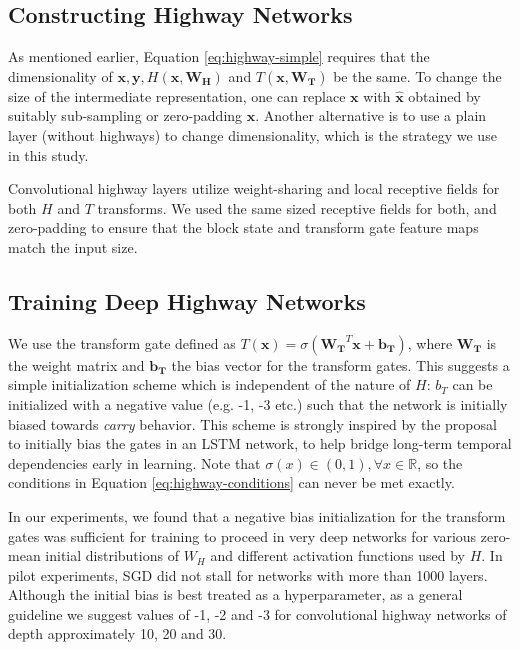 \documentclass{article}
\renewcommand{\vec}[1]{\mathbf{#1}}
\begin{document}
\subsection{Constructing Highway Networks}

As mentioned earlier, Equation \ref{eq:highway-simple} requires that the dimensionality of $\vec{x}, \vec{y}, H(\vec{x}, \vec{W_H})$ and $T(\vec{x}, \vec{W_T})$ be the same. To change the size of the intermediate representation, one can replace $\vec{x}$ with $\vec{\hat{x}}$ obtained by suitably sub-sampling or zero-padding $\vec{x}$. Another alternative is to use a plain layer (without highways) to change dimensionality, which is the strategy we use in this study.

Convolutional highway layers utilize weight-sharing and local receptive fields for both $H$ and $T$ transforms. We used the same sized receptive fields for both, and zero-padding to ensure that the block state and transform gate feature maps match the input size.

\subsection{Training Deep Highway Networks}



We use the transform gate defined as $T(\vec{x}) = \sigma(\vec{W_T}^T\vec{x} + \vec{b_T})$, where $\vec{W_T}$ is the weight matrix and $\vec{b_T}$ the bias vector for the transform gates. This suggests a simple initialization scheme which is independent of the nature of $H$: $b_T$ can be initialized with a negative value (e.g. -1, -3 etc.) such that the network is initially biased towards \emph{carry} behavior. This scheme is strongly inspired by the proposal \cite{Gers1999} to initially bias the gates in an LSTM network, to help bridge long-term temporal dependencies early in learning. Note that $\sigma(x) \in (0, 1), \forall x \in \mathbb{R}$, so the conditions in Equation \ref{eq:highway-conditions} can never be met exactly. 

In our experiments, we found that a negative bias initialization for the transform gates was sufficient for training to proceed in very deep networks for various zero-mean initial distributions of $W_H$ and different activation functions used by $H$. In pilot experiments, SGD did not stall for networks with more than 1000 layers. Although the initial bias is best treated as a hyperparameter, as a general guideline we suggest values of -1, -2 and -3 for convolutional highway networks of depth approximately 10, 20 and 30.
\end{document}
